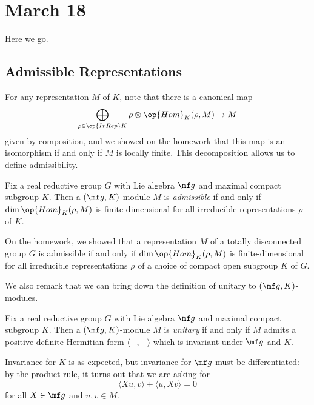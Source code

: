 \documentclass[../notes.tex]{subfiles}
\begin{document}
\section{March 18}
Here we go.

\subsection{Admissible Representations}
For any representation $M$ of $K$, note that there is a canonical map
\[\bigoplus_{\rho\in\op{IrRep}K}\rho\otimes\op{Hom}_K(\rho,M)\to M\]
given by composition, and we showed on the homework that this map is an isomorphism if and only if $M$ is locally finite. This decomposition allows us to define admissibility.
\begin{definition}[admissible]
	Fix a real reductive group $G$ with Lie algebra $\mf g$ and maximal compact subgroup $K$. Then a $(\mf g,K)$-module $M$ is \textit{admissible} if and only if $\dim\op{Hom}_K(\rho,M)$ is finite-dimensional for all irreducible representations $\rho$ of $K$.
\end{definition}
\begin{remark}
	On the homework, we showed that a representation $M$ of a totally disconnected group $G$ is admissible if and only if $\dim\op{Hom}_K(\rho,M)$ is finite-dimensional for all irreducible representations $\rho$ of a choice of compact open subgroup $K$ of $G$.
\end{remark}
We also remark that we can bring down the definition of unitary to $(\mf g,K)$-modules.
\begin{definition}[unitary]
	Fix a real reductive group $G$ with Lie algebra $\mf g$ and maximal compact subgroup $K$. Then a $(\mf g,K)$-module $M$ is \textit{unitary} if and only if $M$ admits a positive-definite Hermitian form $\langle-,-\rangle$ which is invariant under $\mf g$ and $K$.
\end{definition}
\begin{remark}
	Invariance for $K$ is as expected, but invariance for $\mf g$ must be differentiated: by the product rule, it turns out that we are asking for
	\[\langle Xu,v\rangle+\langle u,Xv\rangle=0\]
	for all $X\in\mf g$ and $u,v\in M$.
\end{remark}
\end{document}
